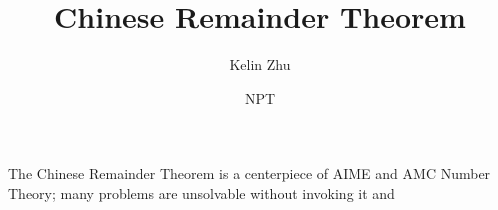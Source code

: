 \documentclass[mast]{lucky}
\title{Chinese Remainder Theorem}
\author{Kelin Zhu}
\date{NPT}
\begin{document}
\maketitle

The Chinese Remainder Theorem is a centerpiece of AIME and AMC Number Theory; many problems are unsolvable without invoking it and 
\end{document}
